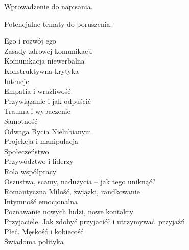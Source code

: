 Wprowadzenie do napisania.

\vin Potencjalne tematy do poruszenia:

Ego i rozwój ego \\
Zasady zdrowej komunikacji \\
Komunikacja niewerbalna \\
Konstruktywna krytyka \\
Intencje \\
Empatia i wrażliwość \\
Przywiązanie i jak odpuścić \\
Trauma i wybaczenie \\
Samotność \\
Odwaga Bycia Nielubianym \\
Projekcja i manipulacja \\
Społeczeństwo \\
Przywództwo i liderzy \\
Rola współpracy \\
Oszustwa, scamy, nadużycia -- jak tego uniknąć? \\
Romantyczna Miłość, związki, randkowanie \\
Intymność emocjonalna \\
Poznawanie nowych ludzi, nowe kontakty \\
Przyjaciele. Jak zdobyć przyjaciół i utrzymywać przyjaźń \\
Płeć. Męskość i kobiecość \\
Świadoma polityka

